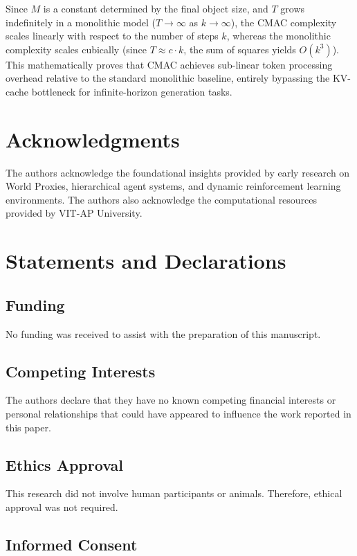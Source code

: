 \documentclass[pdflatex,sn-mathphys-num]{sn-jnl}
\begin{document}
Since $M$ is a constant determined by the final object size, and $T$ grows indefinitely in a monolithic model ($T \rightarrow \infty$ as $k \rightarrow \infty$), the CMAC complexity scales linearly with respect to the number of steps $k$, whereas the monolithic complexity scales cubically (since $T \approx c \cdot k$, the sum of squares yields $O(k^3)$). This mathematically proves that CMAC achieves sub-linear token processing overhead relative to the standard monolithic baseline, entirely bypassing the KV-cache bottleneck for infinite-horizon generation tasks.

\section*{Acknowledgments}

The authors acknowledge the foundational insights provided by early research on World Proxies, hierarchical agent systems, and dynamic reinforcement learning environments. The authors also acknowledge the computational resources provided by VIT-AP University.

\section*{Statements and Declarations}

\subsection*{Funding}

No funding was received to assist with the preparation of this manuscript.

\subsection*{Competing Interests}

The authors declare that they have no known competing financial interests or personal relationships that could have appeared to influence the work reported in this paper.

\subsection*{Ethics Approval}

This research did not involve human participants or animals. Therefore, ethical approval was not required.

\subsection*{Informed Consent}
\end{document}
